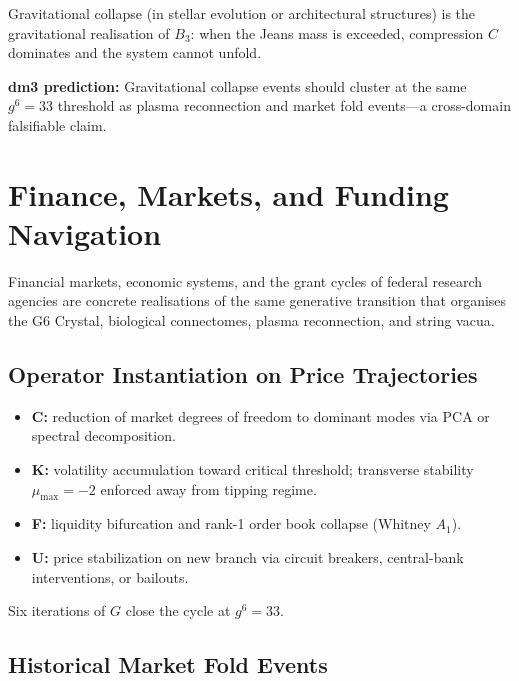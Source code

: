\documentclass[11pt, twoside, openright]{book}
\theoremstyle{plain}
\theoremstyle{definition}
\begin{document}
Gravitational collapse (in stellar evolution or architectural structures)
is the gravitational realisation of $B_3$: when the Jeans mass is
exceeded, compression $C$ dominates and the system cannot unfold.

\textbf{dm3 prediction:} Gravitational collapse events should cluster at
the same $g^6 = 33$ threshold as plasma reconnection and market fold
events---a cross-domain falsifiable claim.

\chapter{Finance, Markets, and Funding Navigation}

Financial markets, economic systems, and the grant cycles of federal
research agencies are concrete realisations of the same generative
transition that organises the G6 Crystal, biological connectomes,
plasma reconnection, and string vacua.

\section{Operator Instantiation on Price Trajectories}

\begin{itemize}[leftmargin=*]
  \item \textbf{C:} reduction of market degrees of freedom to dominant
    modes via PCA or spectral decomposition.
  \item \textbf{K:} volatility accumulation toward critical threshold;
    transverse stability $\mu_{\max} = -2$ enforced away from tipping
    regime.
  \item \textbf{F:} liquidity bifurcation and rank-1 order book collapse
    (Whitney $A_1$).
  \item \textbf{U:} price stabilization on new branch via circuit
    breakers, central-bank interventions, or bailouts.
\end{itemize}

Six iterations of $G$ close the cycle at $g^6 = 33$.

\section{Historical Market Fold Events}
\end{document}
